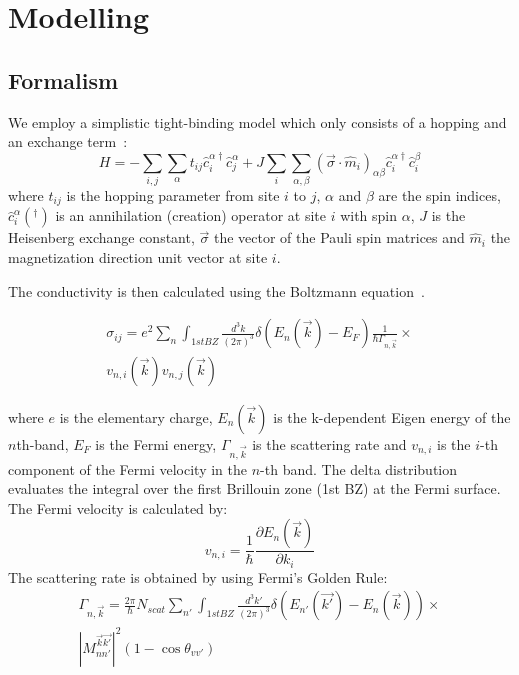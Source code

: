 \documentclass[prb,showpacs,amsmath,amssymb,superscriptaddress,twocolumn,floatfix]{revtex4-1}
\begin{document}
\section{Modelling}
\label{sec_modelling}

\subsection{Formalism}

We employ a simplistic tight-binding model which only consists of a hopping and an exchange term~\cite{Gonzalez-Hernandez:2024}:
\begin{equation}
H = -\sum_{i, j}\sum_\alpha t_{ij} {\hat{c}_i^{\alpha\dagger}} \hat{c}^\alpha_j + J \sum_{i} \sum_{\alpha, \beta} (\vec{\sigma} \cdot \hat{m}_i)_{\alpha \beta} {\hat{c}_i^{\alpha\dagger}} \hat{c}^\beta_i 
	\label{eq_sdmodel}
\end{equation} 
where $t_{ij}$ is the hopping parameter from site $i$ to $j$, $\alpha$ and $\beta$ are the spin indices, ${\hat{c}_i^{\alpha}}(^\dagger)$ is an annihilation (creation) operator at site $i$ with spin $\alpha$, $J$ is the Heisenberg exchange constant, $\vec{\sigma}$ the vector of the Pauli spin matrices and $\hat{m}_i$ the magnetization direction unit vector at site $i$.

The conductivity is then calculated using the Boltzmann equation~\cite{Vyborny:2009}. 

\begin{multline}
	\sigma_{ij} = e^2 \sum_n  \int_ {1st BZ} \frac{d^3k}{(2\pi)^3} \delta(E_n(\vec{k}) - E_F) \frac{1}{\hbar \Gamma_{n, \vec{k}}} \times \\ v_{n,i}(\vec{k}) v_{n,j}(\vec{k})
	\label{eq_Boltzmann_1}
\end{multline}

where $e$ is the elementary charge, $E_n(\vec{k})$ is the k-dependent Eigen energy of the $n$th-band, $E_F$ is the Fermi energy, $\Gamma_{n, \vec{k}}$ is the scattering rate and $v_{n,i}$ is the $i$-th component of the Fermi velocity in the $n$-th band. The delta distribution evaluates the integral over the first Brillouin zone (1st BZ) at the Fermi surface. The Fermi velocity is calculated by:
%
\begin{equation}
v_{n, i} = \frac{1}{\hbar} \frac{\partial E_n(\vec{k})}{\partial k_i}
\end{equation}
%
The scattering rate is obtained by using Fermi's Golden Rule:
%
\begin{multline}
	\Gamma_{n, \vec{k}} = \frac{2 \pi}{\hbar} N_{scat} \sum_{n'}  \int_ {1st BZ} \frac{d^3k'}{(2\pi)^3} \delta(E_{n'}(\vec{k'}) - E_n(\vec{k})) \times \\ |M^{\vec{k}\vec{k'}}_{nn'} |^2 (1 - \cos \theta_{vv'})
	\label{eq_FermiGoldenRule_1}
\end{multline}
\end{document}
